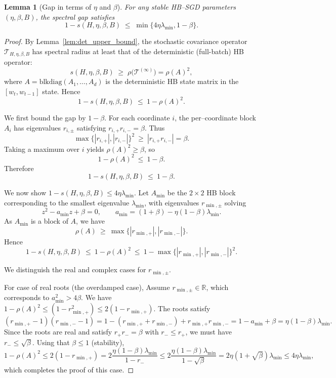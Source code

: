 \documentclass[10pt,a4paper]{amsart}
\newtheorem{lemma}{Lemma}
\begin{document}
\begin{lemma}[Gap in terms of $\eta$ and $\beta$]
\label{lem:gap-etabeta}
For any stable HB--SGD parameters $(\eta,\beta,B)$, the spectral gap satisfies
\[
  1 - s(H,\eta,\beta,B)
  \;\le\;
  \min\big\{ 4 \eta \lambda_{\min} , 1-\beta \big\}.
\]
\end{lemma}

\begin{proof}
By Lemma~\ref{lem:det_upper_bound}, the stochastic covariance operator
$\mathcal{T}_{H,\eta,\beta,B}$ has spectral radius at least that of the
deterministic (full-batch) HB operator:
\[
s(H,\eta,\beta,B)
\;\ge\;
\rho\big(\mathcal{T}^{(\infty)}\big)
=
\rho(A)^2,
\]
where $A=\mathrm{blkdiag}(A_1,\dots,A_d)$ is the deterministic HB state
matrix in the $[w_t,w_{t-1}]$ state. Hence
\[
1 - s(H,\eta,\beta,B)
\ \le\
1 - \rho(A)^2.
\]

We first bound the gap by $1-\beta$. For each coordinate $i$, the
per–coordinate block $A_i$ has eigenvalues $r_{i,\pm}$ satisfying
$r_{i,+}r_{i,-}=\beta$. Thus
\[
\max\{|r_{i,+}|,|r_{i,-}|\}^2
\ \ge\ |r_{i,+}r_{i,-}| = \beta.
\]
Taking a maximum over $i$ yields $\rho(A)^2\ge\beta$, so
\[
1 - \rho(A)^2
\ \le\ 1 - \beta.
\]
Therefore
\[
1 - s(H,\eta,\beta,B)
\ \le\ 1 - \beta.
\]

We now show $1-s(H,\eta,\beta,B)\le 4\eta\lambda_{\min}$.
Let $A_{\min}$ be the $2\times2$ HB block corresponding to the smallest
eigenvalue $\lambda_{\min}$, with eigenvalues $r_{\min,\pm}$ solving
\[
z^2 - a_{\min} z + \beta = 0,
\qquad
a_{\min}=(1+\beta)-\eta(1-\beta)\lambda_{\min}.
\]
As $A_{\min}$ is a block of $A$, we have
\[
\rho(A)
\ \ge\ \max\{|r_{\min,+}|,|r_{\min,-}|\}.
\]
Hence
\[
1 - s(H,\eta,\beta,B)
\ \le\ 1 - \rho(A)^2
\ \le\ 1 - \max\{|r_{\min,+}|,|r_{\min,-}|\}^2.
\]

We distinguish the real and complex cases for $r_{\min,\pm}$.


For case of real roots (the overdamped case),
Assume $r_{\min,\pm}\in\mathbb{R}$, which corresponds to $a_{\min}^2>4\beta$.
We have $1 - \rho(A)^2 \leq (1-r_{\min,+}^2) \le 2(1-r_{\min,+})$.
The roots satisfy
\[
(r_{\min,+}-1)(r_{\min,-}-1)
= 1 - (r_{\min,+}+r_{\min,-}) + r_{\min,+}r_{\min,-}
= 1 - a_{\min} + \beta
= \eta(1-\beta)\lambda_{\min}.
\]
Since the roots are real and satisfy $r_+ r_- = \beta$ with $r_- \le
r_+$, we must have $r_- \le \sqrt{\beta}$. Using that $\beta\leq 1$ (stability),
\[
1 - \rho(A)^2 \leq 2(1-r_{\min,+}) = 2\frac{\eta(1-\beta)\lambda_{\min}}{1-r_-}
\le 2\frac{\eta(1-\beta)\lambda_{\min}}{1-\sqrt{\beta}}
= 2\eta(1+\sqrt{\beta})\lambda_{\min}
\leq 4\eta\lambda_{\min},
\]
which completes the proof of this case.


\end{proof}
\end{document}
